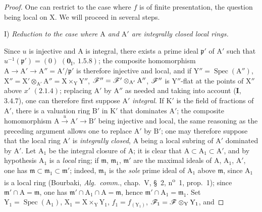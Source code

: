 \begin{proof}
One can restrict to the case where $f$ is of finite presentation, the question being local
on $\mathrm{X}$. We will proceed in several steps.

\medskip
\noindent I) \emph{Reduction to the case where $\mathrm{A}$ and $\mathrm{A}'$ are integrally closed local rings.}

\medskip
Since $u$ is injective and $\mathrm{A}$ is integral, there exists a prime ideal $\mathfrak{p}'$ of $\mathrm{A}'$ such that
$u^{-1}(\mathfrak{p}')=(0)$ $(\mathbf{0}_\mathrm{I},~1.5.8)$; the composite homomorphism $\mathrm{A}\to\mathrm{A}'\to\mathrm{A}''=\mathrm{A}'/\mathfrak{p}'$ is therefore injective
and local, and if $\mathrm{Y}''=\operatorname{Spec}(\mathrm{A}'')$, $\mathrm{X}''=\mathrm{X}'\otimes_{\mathrm{A}'}\mathrm{A}''=\mathrm{X}\times_\mathrm{Y}\mathrm{Y}''$, $\mathscr{F}''=\mathscr{F}'\otimes_{\mathrm{A}'}\mathrm{A}''$, $\mathscr{F}''$ is $\mathrm{Y}''$-flat
at the points of $\mathrm{X}''$ above $x'$ $(2.1.4)$; replacing $\mathrm{A}'$ by $\mathrm{A}''$ as needed and taking
into account (\textbf{I},~$3.4.7$), one can therefore first suppose $\mathrm{A}'$ \emph{integral}. If $\mathrm{K}'$ is the field of
fractions of $\mathrm{A}'$, there is a valuation ring $\mathrm{B}'$ in $\mathrm{K}'$ that dominates $\mathrm{A}'$; the composite
homomorphism $\mathrm{A}\xrightarrow{u}\mathrm{A}'\to\mathrm{B}'$ being injective and local, the same reasoning as
the preceding argument allows one to replace $\mathrm{A}'$ by $\mathrm{B}'$; one may therefore suppose that the local ring $\mathrm{A}'$ is \emph{integrally closed},
$\mathrm{A}$ being a local subring of $\mathrm{A}'$ dominated by $\mathrm{A}'$. Let $\mathrm{A}_1$ be the integral closure of $\mathrm{A}$; it is clear that
$\mathrm{A}\subset\mathrm{A}_1\subset\mathrm{A}'$, and by hypothesis $\mathrm{A}_1$ is a \emph{local} ring;
if $\mathfrak{m}$, $\mathfrak{m}_1$, $\mathfrak{m}'$ are the maximal ideals of $\mathrm{A}$, $\mathrm{A}_1$, $\mathrm{A}'$, one has $\mathfrak{m}\subset\mathfrak{m}_1\subset\mathfrak{m}'$; indeed, $\mathfrak{m}_1$ is
the \emph{sole} prime ideal of $\mathrm{A}_1$ above $\mathfrak{m}$, since $\mathrm{A}_1$ is a local ring (Bourbaki,
\emph{Alg.\ comm.}, chap.~V, \S~2, n\textsuperscript{o}~1, prop.~1); since $\mathfrak{m}'\cap\mathrm{A}=\mathfrak{m}$, one has $\mathfrak{m}'\cap\mathrm{A}_1\cap\mathrm{A}=\mathfrak{m}$,
hence $\mathfrak{m}'\cap\mathrm{A}_1=\mathfrak{m}_1$. Set $\mathrm{Y}_1=\operatorname{Spec}(\mathrm{A}_1)$, $\mathrm{X}_1=\mathrm{X}\times_\mathrm{Y}\mathrm{Y}_1$, $f_1=f_{(\mathrm{Y}_1)}$, $\mathscr{F}_1=\mathscr{F}\otimes_\mathrm{Y}\mathrm{Y}_1$, and

\end{proof}
